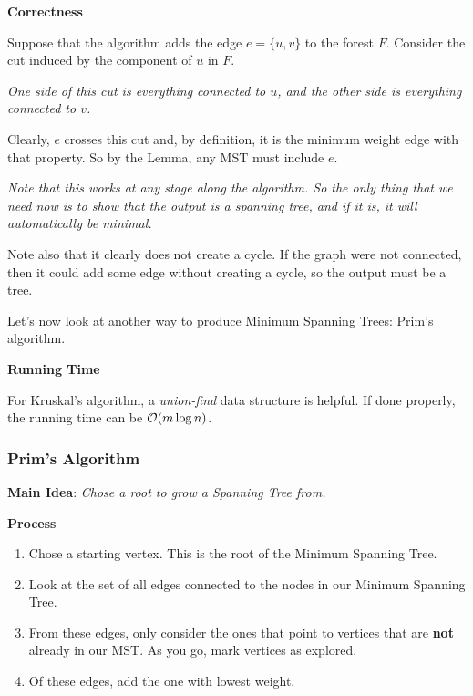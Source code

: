 \documentclass[12pt]{article}
\begin{document}

  {\bf Correctness}

  {
    Suppose that the algorithm adds the edge $e = \{u, v\}$ to the forest $F$.
    Consider the cut induced by the component of $u$ in $F$.

    {
      \it One side of this cut is everything connected to $u$, and the other side
      is everything connected to $v$.
    }

    Clearly, $e$ crosses this cut and, by definition, it is the minimum weight
    edge with that property. So by the Lemma, any MST must include $e$.

    {
      \it Note that this works at any stage along the algorithm. So the only thing
      that we need now is to show that the output is a spanning tree, and if it
      is, it will automatically be minimal.
    }

    Note also that it clearly does not create a cycle. If the graph were not
    connected, then it could add some edge without creating a cycle, so the output
    must be a tree.
  }

  Let's now look at another way to produce Minimum Spanning Trees: Prim's algorithm.

  {\bf Running Time}

  For Kruskal's algorithm, a {\it union-find} data structure is helpful. If done
  properly, the running time can be $\mathcal O(m \log n)$.

  \subsubsection{Prim's Algorithm}

  {\bf Main Idea}: {\it Chose a root to grow a Spanning Tree from.}

  {\bf Process}

  \begin{enumerate}
    \item Chose a starting vertex. This is the root of the Minimum Spanning Tree.
    \item Look at the set of all edges connected to the nodes in our Minimum
      Spanning Tree.

    \item From these edges, only consider the ones that point to
      vertices that are {\bf not} already in our MST. As you go, mark vertices
      as explored.

    \item Of these edges, add the one with lowest weight.
  \end{enumerate}
\end{document}
